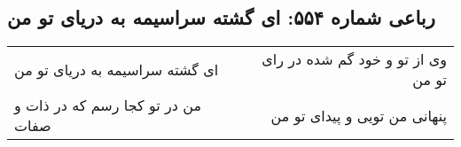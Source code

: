 \begin{center}
\section*{رباعی شماره ۵۵۴: ای گشته سراسیمه به دریای تو من}
\label{sec:sh554}
\begin{longtable}{l p{0.5cm} r}
ای گشته سراسیمه به دریای تو من
&&
وی از تو و خود گم شده در رای تو من
\\
من در تو کجا رسم که در ذات و صفات
&&
پنهانی من تویی و پیدای تو من
\\
\end{longtable}
\end{center}
